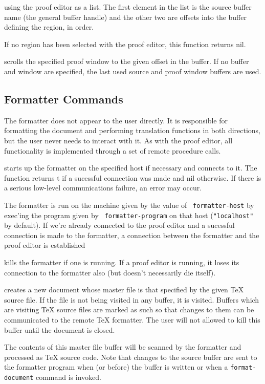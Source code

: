 using the proof editor as a list.  The first element in the list is
the source buffer name (the general buffer handle) and the other two
are offsets into the buffer defining the region, in order.

If no region has been selected with the proof editor, this function
returns nil.

%
scrolls the specified proof window to the given offset in the buffer.
If no buffer and window are specified, the last used source and proof
window buffers are used.


\subsection{Formatter Commands}

The formatter does not appear to the user directly.  It is responsible
for formatting the document and performing translation functions in
both directions, but the user never needs to interact with it.  As with
the proof editor, all functionality is implemented through a set of
remote procedure calls.

%
starts up the formatter on the specified host if necessary and
connects to it.  The function returns t if a sucessful connection was
made and nil otherwise.  If there is a serious low-level
communications failure, an error may occur.

The formatter is run on the machine given by the value of {\tt
formatter-host} by exec'ing the program given by {\tt
formatter-program} on that host ({\tt "localhost"} by default).
If we're already connected to the proof editor and a sucessful
connection is made to the formatter, a connection between the
formatter and the proof editor is established

%
kills the formatter if one is running.  If a proof editor is running,
it loses its connection to the formatter also (but doesn't necessarily
die itself).

%
creates a new document whose master file is that specified by the
given {\TeX} source file.  If the file is not being visited in any
buffer, it is visited.  Buffers which are visiting {\TeX} source files
are marked as such so that changes to them can be communicated to
the remote {\TeX} formatter.   The user will not allowed to kill this
buffer until the document is closed.

The contents of this master file buffer will be scanned by the
formatter and processed as {\TeX} source code.  Note that changes to
the source buffer are sent to the formatter program when (or before)
the buffer is written or when a {\tt format-document} command is
invoked.

